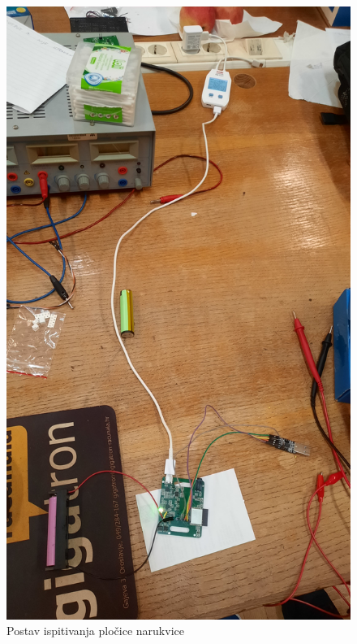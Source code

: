 \begin{figure}[htb]
    \centering
    \includegraphics[width=10 cm]{Figures/BR_TEST_02.jpg}
    \caption{Postav ispitivanja pločice narukvice}
    \label{slk:BR_TEST_01}
\end{figure}
